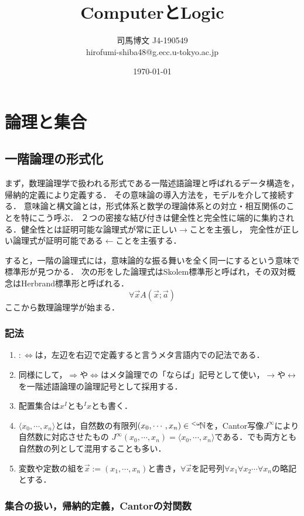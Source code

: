 \documentclass[uplatex, 12pt, dvipdfmx]{jsreport}
\title{ComputerとLogic}
\author{司馬博文 J4-190549\\hirofumi-shiba48@g.ecc.u-tokyo.ac.jp}
\date{\today}
\begin{document}
\tableofcontents

\part{論理と集合}

\chapter{一階論理の形式化}

まず，数理論理学で扱われる形式である一階述語論理と呼ばれるデータ構造を，帰納的定義により定義する．
その意味論の導入方法を，モデルを介して接続する．
意味論と構文論とは，形式体系と数学の理論体系との対立・相互関係のことを特にこう呼ぶ．
２つの密接な結び付きは健全性と完全性に端的に集約される．健全性とは証明可能な論理式が常に正しい$\rightarrow$ことを主張し，
完全性が正しい論理式が証明可能である$\leftarrow$ことを主張する．

すると，一階の論理式には，意味論的な振る舞いを全く同一にするという意味で標準形が見つかる．
次の形をした論理式はSkolem標準形と呼ばれ，その双対概念はHerbrand標準形と呼ばれる．
\[ \forall\vec{x}A(\vec{x};\vec{a}) \]
ここから数理論理学が始まる．

\section{記法}

\begin{enumerate}
    \item $:\Leftrightarrow$は，左辺を右辺で定義すると言うメタ言語内での記法である．
    \item 同様にして，$\Rightarrow$や$\Leftrightarrow$はメタ論理での「ならば」記号として使い，$\to$や$\leftrightarrow$を一階述語論理の論理記号として採用する．
    \item 配置集合は$x^I$とも${}^I\!x$とも書く．
    \item $\langle x_0,\cdots,x_n\rangle$とは，自然数の有限列$(x_0,\cdots,x_n)\in{}^{<\omega}\!\mathbb{N}$を，Cantor写像$J^\infty$により自然数に対応させたもの
    $J^\infty(x_0,\cdots,x_n)=\langle x_0,\cdots,x_n\rangle$である．でも両方とも自然数の列として混用することも多い．
    \item 変数や定数の組を$\vec{x}:=(x_1,\cdots,x_n)$と書き，$\forall\vec{x}$を記号列$\forall x_1\forall x_2\cdots\forall x_n$の略記とする．
\end{enumerate}

\section{集合の扱い，帰納的定義，Cantorの対関数}
\end{document}
